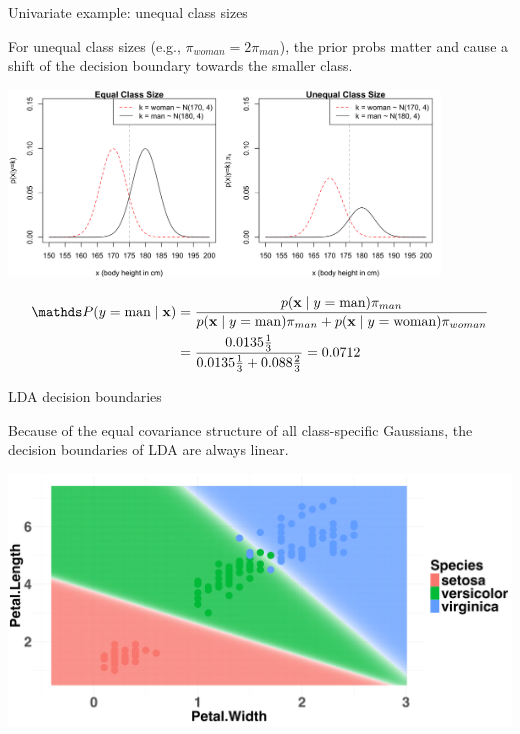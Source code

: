 \documentclass[11pt,compress,t,notes=noshow, xcolor=table]{beamer}
\begin{document}
\begin{vbframe}{Univariate example: unequal class sizes}
\begin{small}
For unequal class sizes (e.g., $\pi_{woman} = 2\pi_{man}$), the prior probs matter and cause a shift of the decision boundary towards the smaller class.
\begin{center}
\includegraphics[width=0.86\textwidth, clip=true, trim={0 0 0 0}]{figure/disc_univariate-3.png}
\end{center}
\begin{align*}
\P(y = \text{man} \mid \xv) &= \frac{p(\xv \mid y = \text{man}) \pi_{man}}{p(\xv \mid y = \text{man}) \pi_{man} + p(\xv \mid y = \text{woman}) \pi_{woman}}\\
&=\frac{0.0135 \tfrac{1}{3}}{0.0135 \tfrac{1}{3} + 0.088 \tfrac{2}{3}} = 0.0712
\end{align*}

\end{small}

\end{vbframe}
\begin{vbframe}{LDA decision boundaries}

Because of the equal covariance structure of all class-specific Gaussians, the decision boundaries of LDA are always linear.

\begin{center}
\includegraphics[width=\textwidth, clip=true, trim={0 0 0 0}]{figure/disc_db-lda.png}
\end{center}

\end{vbframe}
\end{document}
